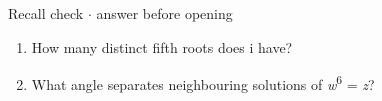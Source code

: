 \documentclass[11pt]{article}
\begin{document}
\begin{keepsection}
\begin{keepsection}
\begin{recallbox}{Recall check \ensuremath{\cdot} answer before opening}
\begin{enumerate}
\item How many distinct fifth roots does i have?
\item What angle separates neighbouring solutions of \textit{w}\textsuperscript{6} = \textit{z}?
\end{enumerate}

\end{recallbox}
\end{keepsection}
\end{keepsection}
\end{document}
